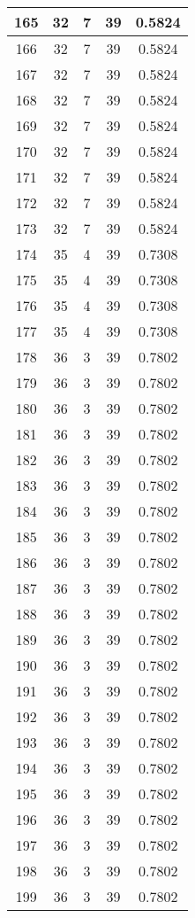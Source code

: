 \documentclass[letterpaper, 12pt]{article}
\begin{document}
\begin{longtable}{|c|c|c|c|c|}
\hline
165 & 32 & 7 & 39 & 0.5824 \\
\hline
166 & 32 & 7 & 39 & 0.5824 \\
\hline
167 & 32 & 7 & 39 & 0.5824 \\
\hline
168 & 32 & 7 & 39 & 0.5824 \\
\hline
169 & 32 & 7 & 39 & 0.5824 \\
\hline
170 & 32 & 7 & 39 & 0.5824 \\
\hline
171 & 32 & 7 & 39 & 0.5824 \\
\hline
172 & 32 & 7 & 39 & 0.5824 \\
\hline
173 & 32 & 7 & 39 & 0.5824 \\
\hline
174 & 35 & 4 & 39 & 0.7308 \\
\hline
175 & 35 & 4 & 39 & 0.7308 \\
\hline
176 & 35 & 4 & 39 & 0.7308 \\
\hline
177 & 35 & 4 & 39 & 0.7308 \\
\hline
178 & 36 & 3 & 39 & 0.7802 \\
\hline
179 & 36 & 3 & 39 & 0.7802 \\
\hline
180 & 36 & 3 & 39 & 0.7802 \\
\hline
181 & 36 & 3 & 39 & 0.7802 \\
\hline
182 & 36 & 3 & 39 & 0.7802 \\
\hline
183 & 36 & 3 & 39 & 0.7802 \\
\hline
184 & 36 & 3 & 39 & 0.7802 \\
\hline
185 & 36 & 3 & 39 & 0.7802 \\
\hline
186 & 36 & 3 & 39 & 0.7802 \\
\hline
187 & 36 & 3 & 39 & 0.7802 \\
\hline
188 & 36 & 3 & 39 & 0.7802 \\
\hline
189 & 36 & 3 & 39 & 0.7802 \\
\hline
190 & 36 & 3 & 39 & 0.7802 \\
\hline
191 & 36 & 3 & 39 & 0.7802 \\
\hline
192 & 36 & 3 & 39 & 0.7802 \\
\hline
193 & 36 & 3 & 39 & 0.7802 \\
\hline
194 & 36 & 3 & 39 & 0.7802 \\
\hline
195 & 36 & 3 & 39 & 0.7802 \\
\hline
196 & 36 & 3 & 39 & 0.7802 \\
\hline
197 & 36 & 3 & 39 & 0.7802 \\
\hline
198 & 36 & 3 & 39 & 0.7802 \\
\hline
199 & 36 & 3 & 39 & 0.7802 \\
\hline
\end{longtable}
\end{document}
